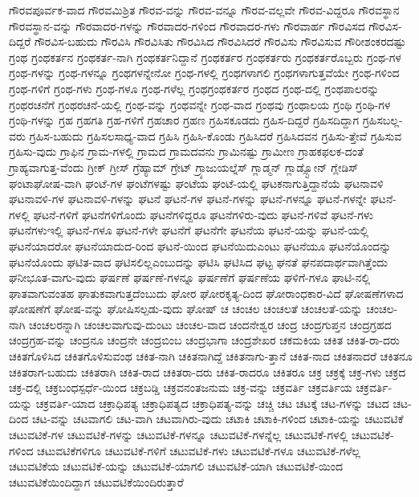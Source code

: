 {ಗೌರವಪೂರ್ವಕ-ವಾದ
ಗೌರವಮಿಶ್ರಿತ
ಗೌರವ-ವನ್ನು
ಗೌರವ-ವನ್ನೂ
ಗೌರವ-ವಲ್ಲವೇ
ಗೌರವ-ವಿದ್ದರೂ
ಗೌರವಸ್ಥಾನ
ಗೌರವಸ್ಥಾನ-ವನ್ನು
ಗೌರವಾದರ-ಗಳನ್ನು
ಗೌರವಾದರ-ಗಳಿಂದ
ಗೌರವಾದರ-ಗಳು
ಗೌರವಾರ್ಹ
ಗೌರವಿಸದ
ಗೌರವಿಸ-ದಿದ್ದರೆ
ಗೌರವಿಸ-ಬಹುದು
ಗೌರವಿಸಿ
ಗೌರವಿಸಿತು
ಗೌರವಿಸಿದ
ಗೌರವಿಸಿದರೆ
ಗೌರವಿಸು
ಗೌರವಿಸುವ
ಗೌರೀಶಂಕರದಷ್ಟು
ಗ್ರಂಥ
ಗ್ರಂಥಕರ್ತನ
ಗ್ರಂಥಕರ್ತ-ನಾಗಿ
ಗ್ರಂಥಕರ್ತನಿದ್ದಾನೆ
ಗ್ರಂಥಕರ್ತರ
ಗ್ರಂಥಕರ್ತರು
ಗ್ರಂಥಕರ್ತರೊಬ್ಬರು
ಗ್ರಂಥ-ಗಳ
ಗ್ರಂಥ-ಗಳನ್ನು
ಗ್ರಂಥ-ಗಳನ್ನೂ
ಗ್ರಂಥಗಳನ್ನೇನೋ
ಗ್ರಂಥ-ಗಳಲ್ಲಿ
ಗ್ರಂಥಗಳಾಗಲಿ
ಗ್ರಂಥಗಳಾಗುತ್ತವೆಯೇ
ಗ್ರಂಥ-ಗಳಿಂದ
ಗ್ರಂಥ-ಗಳಿಗೆ
ಗ್ರಂಥ-ಗಳು
ಗ್ರಂಥ-ಗಳೂ
ಗ್ರಂಥ-ಗಳೆಲ್ಲ
ಗ್ರಂಥಗ್ರಂಥಕರ್ತರ
ಗ್ರಂಥದ
ಗ್ರಂಥ-ದಲ್ಲಿ
ಗ್ರಂಥಪಾಲರನ್ನು
ಗ್ರಂಥರಚನೆಗೆ
ಗ್ರಂಥರಚನೆ-ಯಲ್ಲಿ
ಗ್ರಂಥ-ವನ್ನು
ಗ್ರಂಥವನ್ನೇ
ಗ್ರಂಥ-ವಾದ
ಗ್ರಂಥವು
ಗ್ರಂಥಾಲಯ
ಗ್ರಂಥಿ
ಗ್ರಂಥಿ-ಗಳ
ಗ್ರಂಥಿ-ಗಳನ್ನು
ಗ್ರಹ
ಗ್ರಹಗತಿ
ಗ್ರಹ-ಗಳಿಗೆ
ಗ್ರಹಚಾರ
ಗ್ರಹಣ
ಗ್ರಹಿಸಕೂಡದು
ಗ್ರಹಿಸ-ದಿದ್ದರೆ
ಗ್ರಹಿಸದಿದ್ದಾಗ
ಗ್ರಹಿಸಬಲ್ಲ-ವರು
ಗ್ರಹಿಸ-ಬಹುದು
ಗ್ರಹಿಸಲಸಾಧ್ಯ-ವಾದ
ಗ್ರಹಿಸಿ
ಗ್ರಹಿಸಿ-ಕೊಂಡು
ಗ್ರಹಿಸಿದರೆ
ಗ್ರಹಿಸಿದವನ
ಗ್ರಹಿಸು-ತ್ತೇವೆ
ಗ್ರಹಿಸುವ
ಗ್ರಹಿಸು-ವುದು
ಗ್ರಾಫಿನ
ಗ್ರಾಮ-ಗಳಲ್ಲಿ
ಗ್ರಾಮದ
ಗ್ರಾಮದವನು
ಗ್ರಾಮಿನಷ್ಟು
ಗ್ರಾಮೀಣ
ಗ್ರಾಹಕಫಲಕ-ದಂತೆ
ಗ್ರಾಹ್ಯವಾಗುತ್ತ-ವೆಂದು
ಗ್ರೀಕ್
ಗ್ರೀಸ್
ಗ್ರೆಹ್ಯಾಮ್
ಗ್ರೇಟ್
ಗ್ರ್ಯಾಜುಯಲ್ನೆಸ್
ಗ್ಲಾಡ್ಮನ್
ಗ್ಲಾಡ್ಸ್ಟೋನ್
ಗ್ಲೇಡಿಸ್
ಘಂಟಾಘೋಷ-ವಾಗಿ
ಘಂಟೆ-ಗಳ
ಘಂಟೆಗಳಷ್ಟು
ಘಂಟೆಯ
ಘಂಟೆ-ಯಲ್ಲಿ
ಘಟಕನಾಗುತ್ತಿದ್ದಾನೆಯೆ
ಘಟನಾವಳಿ
ಘಟನಾವಳಿ-ಗಳ
ಘಟನಾವಳಿ-ಗಳನ್ನು
ಘಟನೆ
ಘಟನೆ-ಗಳ
ಘಟನೆ-ಗಳನ್ನು
ಘಟನೆ-ಗಳನ್ನೂ
ಘಟನೆ-ಗಳನ್ನೇ
ಘಟನೆ-ಗಳಲ್ಲಿ
ಘಟನೆ-ಗಳಿಗೆ
ಘಟನೆಗಳಿಗೊಂದು
ಘಟನೆಗಳಿದ್ದರೂ
ಘಟನೆಗಳಿರು-ವುದು
ಘಟನೆ-ಗಳಿವೆ
ಘಟನೆ-ಗಳು
ಘಟನೆಗಳುಇಲ್ಲಿ
ಘಟನೆ-ಗಳೂ
ಘಟನೆ-ಗಳೇ
ಘಟನೆಗೆ
ಘಟನೆಗೇ
ಘಟನೆಯ
ಘಟನೆ-ಯನ್ನು
ಘಟನೆ-ಯಲ್ಲಿ
ಘಟನೆಯಾದರೋ
ಘಟನೆಯಾದುದ-ರಿಂದ
ಘಟನೆ-ಯಿಂದ
ಘಟನೆಯಿದುಎಂಟು
ಘಟನೆಯೂ
ಘಟನೆಯೊಂದನ್ನು
ಘಟನೆಯೊಂದು
ಘಟಿತ-ವಾದ
ಘಟಿಸಲಿಲ್ಲಎಂಬುದನ್ನು
ಘಟಿಸಿ
ಘಟಿಸಿದ
ಘಟ್ಟ
ಘನತೆ
ಘನಪದಾರ್ಥವಾಗಿತ್ತೆಂದು
ಘನೀಭೂತ-ವಾಗು-ವುದು
ಘರ್ಷಣೆ
ಘರ್ಷಣೆ-ಗಳನ್ನೂ
ಘರ್ಷಣೆಗೆ
ಘರ್ಷಣೆಯ
ಘಳಿಗೆ-ಗಳೂ
ಘಾಟಿ-ನಲ್ಲಿ
ಘಾತವಾಗುವಂತಹ
ಘಾತುಕವಾಗುತ್ತದೆಂಬುದು
ಘೋರ
ಘೋರಕೃತ್ಯ-ದಿಂದ
ಘೋರಾಂಧಕಾರ-ವಿದೆ
ಘೋಷಣೆಗಳಾದ
ಘೋಷಣೆಗೆ
ಘೋಷ-ವನ್ನು
ಘೋಷಿಸಲ್ಪಡು-ವುದು
ಘೋಷ್
ಚ
ಚಂಚಲ
ಚಂಚಲತೆ
ಚಂಚಲತೆ-ಯನ್ನು
ಚಂಚಲ-ನಾಗಿ
ಚಂಚಲರನ್ನಾಗಿ
ಚಂಚಲವಾಗುವು-ದುಂಟು
ಚಂಚಲ-ವಾದ
ಚಂದನೇಶ್ವರ
ಚಂದ್ರ
ಚಂದ್ರಗುಪ್ತನ
ಚಂದ್ರಗ್ರಹದ
ಚಂದ್ರಗ್ರಹ-ವನ್ನು
ಚಂದ್ರನೂ
ಚಂದ್ರನೇ
ಚಂದ್ರಬಿಂಬ
ಚಂದ್ರಭಾಗಾ
ಚಂದ್ರಶೇಖರ
ಚಕಮಕಿಯ
ಚಕಿತ
ಚಕಿತ-ರಾ-ದರು
ಚಕಿತಗೊಳಿಸಿದ
ಚಕಿತಗೊಳಿಸುವಂಥ
ಚಕಿತ-ನಾಗಿ
ಚಕಿತನಾಗಿದ್ದೆ
ಚಕಿತನಾಗು-ತ್ತಾನೆ
ಚಕಿತ-ನಾದ
ಚಕಿತನಾದರೆ
ಚಕಿತನೂ
ಚಕಿತರಾಗ-ಬಹುದು
ಚಕಿತರಾಗಿ
ಚಕಿತ-ರಾದ
ಚಕಿತರಾ-ದರು
ಚಕಿತ-ರಾದರೂ
ಚಕಿತರೂ
ಚಕ್ರ
ಚಕ್ರಕ್ಕೆ
ಚಕ್ರ-ಗಳು
ಚಕ್ರದ
ಚಕ್ರ-ದಲ್ಲಿ
ಚಕ್ರಬಂಧಸ್ಪರ್ಧೆ-ಯಿಂದ
ಚಕ್ರಬಡ್ಡಿ
ಚಕ್ರವನಂತಜನುಮ
ಚಕ್ರ-ವನ್ನು
ಚಕ್ರವರ್ತಿ
ಚಕ್ರವರ್ತಿಯ
ಚಕ್ರವರ್ತಿ-ಯನ್ನು
ಚಕ್ರವರ್ತಿ-ಯಾದ
ಚಕ್ರಾಧಿಪತ್ಯ
ಚಕ್ರಾಧಿಪತ್ಯದ
ಚಕ್ರಾಧಿಪತ್ಯ-ವನ್ನು
ಚಚ್ಚಿ
ಚಟ
ಚಟಕ್ಕೆ
ಚಟ-ಗಳನ್ನು
ಚಟದ
ಚಟ-ದಿಂದ
ಚಟ-ವನ್ನು
ಚಟವಾಗಲಿ
ಚಟ-ವಾಗಿ
ಚಟವಾಗಿರು-ವುದು
ಚಟಾಕಿ
ಚಟಾಕಿ-ಗಳಿಂದ
ಚಟಾಕಿ-ಯನ್ನು
ಚಟುವಟಿಕೆ
ಚಟುವಟಿಕೆ-ಗಳ
ಚಟುವಟಿಕೆ-ಗಳನ್ನು
ಚಟುವಟಿಕೆ-ಗಳನ್ನೂ
ಚಟುವಟಿಕೆ-ಗಳನ್ನೆಲ್ಲ
ಚಟುವಟಿಕೆ-ಗಳಲ್ಲಿ
ಚಟುವಟಿಕೆ-ಗಳಿಂದ
ಚಟುವಟಿಕೆಗಳಿಗೂ
ಚಟುವಟಿಕೆ-ಗಳಿಗೆ
ಚಟುವಟಿಕೆ-ಗಳು
ಚಟುವಟಿಕೆ-ಗಳೂ
ಚಟುವಟಿಕೆ-ಗಳೆಲ್ಲ
ಚಟುವಟಿಕೆಯ
ಚಟುವಟಿಕೆ-ಯನ್ನು
ಚಟುವಟಿಕೆ-ಯಾಗಲಿ
ಚಟುವಟಿಕೆ-ಯಾಗಿ
ಚಟುವಟಿಕೆ-ಯಿಂದ
ಚಟುವಟಿಕೆಯಿಂದಿದ್ದಾಗ
ಚಟುವಟಿಕೆಯಿಂದಿರುತ್ತಾರೆ
}
